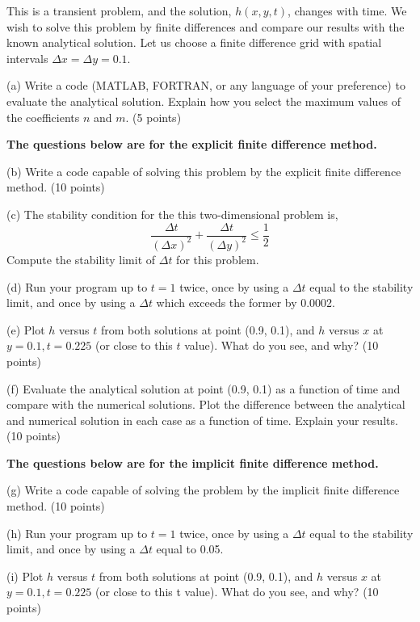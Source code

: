 \documentclass[11pt,letterpaper]{article}
\begin{document}
\medskip

This is a transient problem, and the solution, $h(x,y,t)$, changes with time. We wish to solve this problem by finite differences and compare our results with the known analytical solution. Let us choose a finite difference grid with spatial intervals $\Delta x = \Delta y = 0.1$.

\medskip

(a) Write a code (MATLAB, FORTRAN, or any language of your preference) to evaluate the analytical solution. Explain how you select the maximum values of the coefficients $n$ and $m$. (5 points) 

\medskip

\textbf{The questions below are for the explicit finite difference method.}

\medskip

(b) Write a code capable of solving this problem by the explicit finite difference method. (10 points)

\medskip
(c) The stability condition for the this two-dimensional problem is,
$$\frac{\Delta t}{(\Delta x)^2} + \frac{\Delta t}{(\Delta y)^2} \leq \frac12$$ Compute the stability limit of $\Delta t$ for this problem. 

\medskip
(d) Run your program up to $t = 1$ twice, once by using a $\Delta t$ equal to the stability limit, and once by using a $\Delta t$ which exceeds the former by 0.0002.

\medskip
(e) Plot $h$ versus $t$ from both solutions at point (0.9, 0.1), and $h$ versus $x$ at $y = 0.1, t = 0.225$ (or close to this $t$ value). What do you see, and why? (10 points)

\medskip
(f) Evaluate the analytical solution at point (0.9, 0.1) as a function of time and compare with the numerical solutions. Plot the difference between the analytical and numerical solution in each case as a function of time. Explain your results. (10 points)

\medskip
\textbf{The questions below are for the implicit finite difference method.}
\medskip

(g) Write a code capable of solving the problem by the implicit finite difference method. (10 points)

\medskip
(h) Run your program up to $t = 1$ twice, once by using a $\Delta t$ equal to the stability limit, and once by using a $\Delta t$ equal to 0.05. 

\medskip
(i) Plot $h$ versus $t$ from both solutions at point (0.9, 0.1), and $h$ versus $x$ at $y = 0.1, t = 0.225$ (or close to this t value). What do you see, and why? (10 points)   
\end{document}
